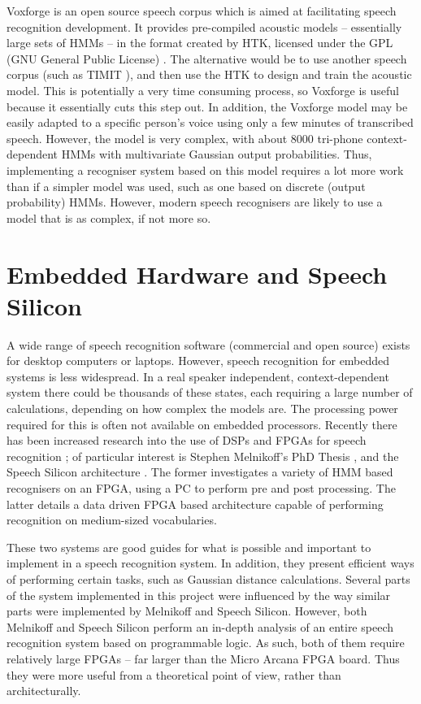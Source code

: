 	Voxforge is an open source speech corpus which is aimed at facilitating speech recognition development.  It provides pre-compiled acoustic models -- essentially large sets of HMMs -- in the format created by HTK, licensed under the GPL (GNU General Public License) \cite{voxforge}.  The alternative would be to use another speech corpus (such as TIMIT \cite{timit}), and then use the HTK to design and train the acoustic model.  This is potentially a very time consuming process, so Voxforge is useful because it essentially cuts this step out.  In addition, the Voxforge model may be easily adapted to a specific person's voice using only a few minutes of transcribed speech.  However, the model is very complex, with about 8000 tri-phone context-dependent HMMs with multivariate Gaussian output probabilities.  Thus, implementing a recogniser system based on this model requires a lot more work than if a simpler model was used, such as one based on discrete (output probability) HMMs.  However, modern speech recognisers are likely to use a model that is as complex, if not more so.


\section{Embedded Hardware and Speech Silicon} %
\label{sec:embedded_hardware}
	A wide range of speech recognition software (commercial and open source) exists for desktop computers or laptops.  However, speech recognition for embedded systems is less widespread.  In a real speaker independent, context-dependent system there could be thousands of these states, each requiring a large number of calculations, depending on how complex the models are.  The processing power required for this is often not available on embedded processors.  Recently there has been increased research into the use of DSPs and FPGAs for speech recognition \cite{nedevschi2005hardware}; of particular interest is Stephen Melnikoff's PhD Thesis \cite{melnikoff2003speech}, and the Speech Silicon architecture \cite{schuster2006speech}.  The former investigates a variety of HMM based recognisers on an FPGA, using a PC to perform pre and post processing.  The latter details a data driven FPGA based architecture capable of performing recognition on medium-sized vocabularies.

	These two systems are good guides for what is possible and important to implement in a speech recognition system.  In addition, they present efficient ways of performing certain tasks, such as Gaussian distance calculations.  Several parts of the system implemented in this project were influenced by the way similar parts were implemented by Melnikoff and Speech Silicon.  However, both Melnikoff and Speech Silicon perform an in-depth analysis of an entire speech recognition system based on programmable logic.  As such, both of them require relatively large FPGAs -- far larger than the Micro Arcana FPGA board.  Thus they were more useful from a theoretical point of view, rather than architecturally.


